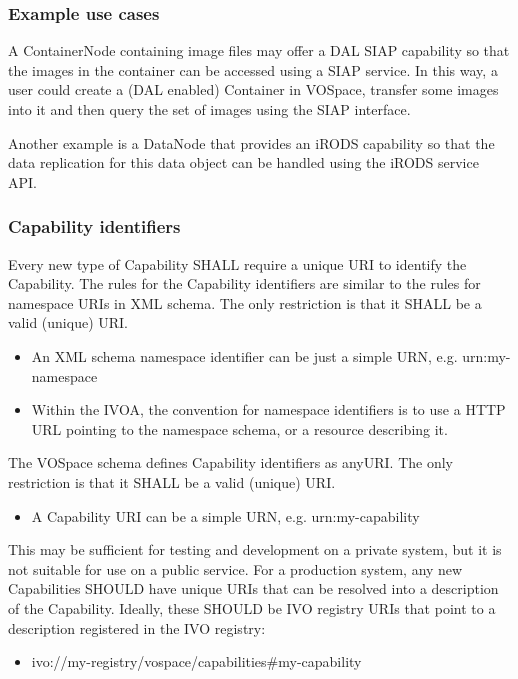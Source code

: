 \documentclass[11pt,a4paper]{ivoa}
\begin{document}
\subsubsection{Example use cases}
A ContainerNode containing image files may offer a DAL SIAP capability so that the images in the container can be accessed using a SIAP service. In this way, a user could create a (DAL enabled) Container in VOSpace, transfer some images into it and then query the set of images using the SIAP interface.

Another example is a DataNode that provides an iRODS capability so that the data replication for this data object can be handled using the iRODS service API.

\subsubsection{Capability identifiers}
Every new type of Capability SHALL require a unique URI to identify the Capability. The rules for the Capability identifiers are similar to the rules for namespace URIs in XML schema. The only restriction is that it SHALL be a valid (unique) URI.

\begin{itemize}
    \item An XML schema namespace identifier can be just a simple URN, e.g. urn:my-namespace
    \item Within the IVOA, the convention for namespace identifiers is to use a HTTP URL pointing to the namespace schema, or a resource describing it.
\end{itemize}

The VOSpace schema defines Capability identifiers as anyURI. The only restriction is that it SHALL be a valid (unique) URI.

\begin{itemize}
    \item A Capability URI can be a simple URN, e.g. urn:my-capability
\end{itemize}

This may be sufficient for testing and development on a private system, but it is not suitable for use on a public service. For a production system, any new Capabilities SHOULD have unique URIs that can be resolved into a description of the Capability. Ideally, these SHOULD be IVO registry URIs that point to a description registered in the IVO registry:

\begin{itemize}
    \item ivo://my-registry/vospace/capabilities\#my-capability
\end{itemize}
\end{document}
